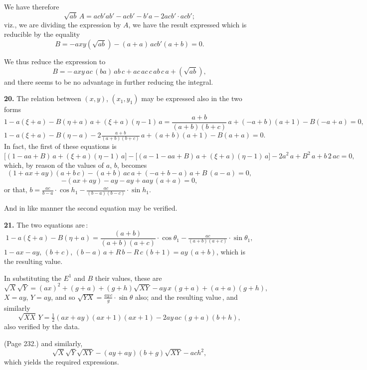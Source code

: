 \documentclass[11pt,a4paper]{book}
\begin{document}
We have therefore
\[
\sqrt{a b}\,A = a c b' a b' - a c b' - b' a - 2 a c b' \cdot a c b';
\]
viz., we are dividing the expression by $A$, we have the result expressed which is reducible by the equality
\[
B = -a x y (\sqrt{a b}) - (a + a)\,a c b' (a + b) = 0.
\]

We thus reduce the expression to
\[
B = -\,a x y\,a c\,(b a)\,a b\,c + a c\,a c\,c\,a b\,c\,a + (\sqrt{a b}),
\]
and there seems to be no advantage in further reducing the integral.

\medskip

\noindent\textbf{20.} The relation between $(x, y)$, $(x_1, y_1)$ may be expressed also in the two forms
\[
1 - a (\xi + a) - B (\eta + a)\,a + (\xi + a)(\eta - 1)\,a = \frac{a + b}{(a + b)(b + c)}\,a + (- a + b)(a + 1) - B (- a + a) = 0,
\]
\[
1 - a(\xi + a) - B (\eta - a) - 2 \tfrac{a + b}{(a + b)(b + c)}\,a + (a + b)(a + 1) - B (a + a) = 0.
\]
In fact, the first of these equations is
\[
\Big[(1 - aa + B)\,a + (\xi + a)(\eta - 1)\,a\Big] - \Big[(a - 1 - a a + B)\,a + (\xi + a)(\eta - 1)\,a\Big] - 2 a^2\,a + B^2\,a + b\,2\,a c = 0,
\]
which, by reason of the values of $a$, $b$, becomes
\[
(1 + a x + a y)(a + b\,c) - (a + b)\,a c\,a + (- a + b - a)\,a + B\,(a - a) = 0,
\]
\[
- (a x + a y) - a y - a y + a a y\,(a + a) = 0,
\]
or that, $b = \frac{a c}{ b - a}\cdot \cos h_1 - \tfrac{a c}{(b - a)(b - c)}\cdot \sin h_1$.

And in like manner the second equation may be verified.

\medskip

\noindent\textbf{21.} The two equations are\,:
\[
1 - a (\xi + a) - B (\eta + a) = \frac{(a + b)}{(a + b)(a + c)}\cdot \cos \theta_1 - \tfrac{a c}{(a + b)(a + c)}\cdot \sin\theta_1,
\]
$1 - a x - a y$, $(b + c)$, $(b - a)\,a + R\,b - R\,c\,(b + 1) = a y\,(a + b)$,
which is the resulting value.

In substituting the $E^1$ and $B$ their values, these are
\[
\sqrt{X}\sqrt{Y} = (a x)^2 + (g + a) + (g + h)\sqrt{X Y} - a y\,x\,(g + a) + (a + a)(g + h),
\]
$X = a y$, $Y = a y$, and so $\sqrt{Y X} = \tfrac{a y\,c}{ g} \cdot \sin\theta$ also; and the resulting value\,, and similarly
\[
\sqrt{X X}\,Y = \tfrac{1}{2} (a x + a y)(a x + 1)(a x + 1) - 2 a y\,a c\,(g + a)(b + h),
\]
also verified by the data.

\medskip

\noindent (Page 232.) and similarly,
\[
\sqrt{X}\sqrt{Y}\sqrt{XY} - (a y + a y)(b + g)\sqrt{XY} - a c h^2,
\]
which yields the required expressions.
\end{document}
